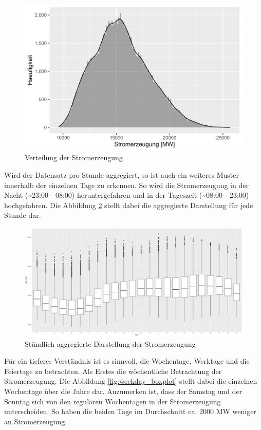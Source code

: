 \documentclass[11pt,ngerman,a4paper,]{article}
\begin{document}
\begin{figure}[H]
\centering
\includegraphics[width=1.0\textwidth]{plots/histogram.png}
\caption{Verteilung der Stromerzeugung}
\label{fig:histogram}
\end{figure}

Wird der Datensatz pro Stunde aggregiert, so ist auch ein weiteres Muster innerhalb der einzelnen Tage zu erkennen. So wird die Stromerzeugung in der Nacht (\textasciitilde23:00 - 08:00) heruntergefahren und in der Tageszeit (\textasciitilde08:00 - 23:00) hochgefahren. Die Abbildung \ref{fig:hour_boxplot} stellt dabei die aggregierte Darstellung für jede Stunde dar.

\begin{figure}[H]
\centering
\includegraphics[width=1.0\textwidth]{plots/hour_boxplot.png}
\caption{Stündlich aggregierte Darstellung der Stromerzeugung}
\label{fig:hour_boxplot}
\end{figure}

Für ein tieferes Verständnis ist es sinnvoll, die Wochentage, Werktage und die Feiertage zu betrachten. Als Erstes die wöchentliche Betrachtung der Stromerzeugung. Die Abbildung \ref{fig:weekday_boxplot} stellt dabei die einzelnen Wochentage über die Jahre dar. Anzumerken ist, dass der Samstag und der Sonntag sich von den regulären Wochentagen in der Stromerzeugung unterscheiden. So haben die beiden Tage im Durchschnitt ca. 2000 MW weniger an Stromerzeugung.
\end{document}
